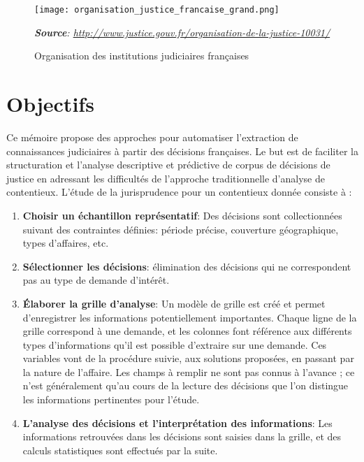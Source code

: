 \begin{figure}[!htb]
	\centering \texttt{[image: organisation\_justice\_francaise\_grand.png]}
	
	\textit{\scriptsize{\textbf{Source}: \url{http://www.justice.gouv.fr/organisation-de-la-justice-10031/}}}  
	\caption{Organisation des institutions judiciaires françaises} \label{orgjusticefrance}
\end{figure}

\section{Objectifs}
 Ce mémoire propose des approches pour automatiser l'extraction de connaissances judiciaires à partir des décisions françaises. Le but est de faciliter la structuration et l'analyse descriptive et prédictive de corpus de décisions de justice en adressant les difficultés de l'approche traditionnelle d'analyse de contentieux. L'étude de la jurisprudence pour un contentieux donnée consiste à \citep{ancel2003expulsion} :
 \begin{enumerate}
 	\item \textbf{Choisir un échantillon représentatif}: Des décisions sont collectionnées suivant des contraintes définies:  période précise, couverture géographique, types d'affaires, etc.
 	\item \textbf{Sélectionner les décisions}: élimination des décisions qui ne correspondent pas au type de demande d'intérêt.
 	\item \textbf{Élaborer la grille d'analyse}: Un modèle de grille est créé et permet d'enregistrer les informations potentiellement importantes. Chaque ligne de la grille correspond à une demande, et les colonnes font référence aux différents types d'informations qu'il est possible d'extraire sur une demande. Ces variables vont de la procédure suivie, aux solutions proposées, en passant par la nature de l'affaire. Les champs à remplir ne sont pas connus à l'avance ; ce n'est généralement qu'au cours de la lecture des décisions que l'on distingue les informations pertinentes pour l'étude.
 	\item \textbf{L'analyse des décisions et l'interprétation des informations}: Les informations retrouvées dans les décisions sont saisies dans la grille, et des calculs statistiques sont effectués par la suite.
 \end{enumerate}
 
